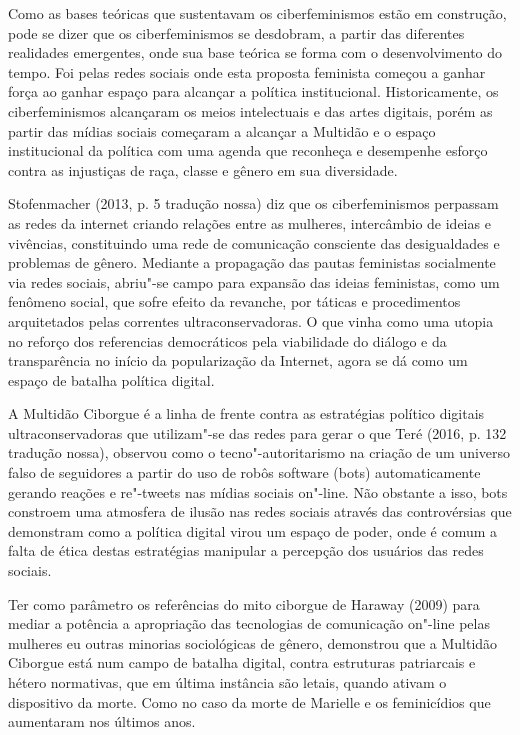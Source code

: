 Como as bases teóricas que sustentavam os ciberfeminismos estão em
construção, pode se dizer que os ciberfeminismos se desdobram, a partir
das diferentes realidades emergentes, onde sua base teórica se forma com
o desenvolvimento do tempo. Foi pelas redes sociais onde esta proposta
feminista começou a ganhar força ao ganhar espaço para alcançar a
política institucional. Historicamente, os ciberfeminismos alcançaram os
meios intelectuais e das artes digitais, porém as partir das mídias
sociais começaram a alcançar a Multidão e o espaço institucional da
política com uma agenda que reconheça e desempenhe esforço contra as
injustiças de raça, classe e gênero em sua diversidade.

Stofenmacher (2013, p. 5 tradução nossa) diz que os ciberfeminismos
perpassam as redes da internet criando relações entre as mulheres,
intercâmbio de ideias e vivências, constituindo uma rede de comunicação
consciente das desigualdades e problemas de gênero. Mediante a
propagação das pautas feministas socialmente via redes sociais, abriu"-se
campo para expansão das ideias feministas, como um fenômeno social, que
sofre efeito da revanche, por táticas e procedimentos arquitetados pelas
correntes ultraconservadoras. O que vinha como uma utopia no reforço dos
referencias democráticos pela viabilidade do diálogo e da transparência
no início da popularização da Internet, agora se dá como um espaço de
batalha política digital.

A Multidão Ciborgue é a linha de frente contra as estratégias político
digitais ultraconservadoras que utilizam"-se das redes para gerar o que
Teré (2016, p. 132 tradução nossa), observou como o tecno"-autoritarismo
na criação de um universo falso de seguidores a partir do uso de robôs
software (bots) automaticamente gerando reações e re"-tweets nas mídias
sociais on"-line. Não obstante a isso, bots constroem uma atmosfera de
ilusão nas redes sociais através das controvérsias que demonstram como a
política digital virou um espaço de poder, onde é comum a falta de ética
destas estratégias manipular a percepção dos usuários das redes sociais.

Ter como parâmetro os referências do mito ciborgue de Haraway (2009)
para mediar a potência a apropriação das tecnologias de comunicação
on"-line pelas mulheres eu outras minorias sociológicas de gênero,
demonstrou que a Multidão Ciborgue está num campo de batalha digital,
contra estruturas patriarcais e hétero normativas, que em última
instância são letais, quando ativam o dispositivo da morte. Como no caso
da morte de Marielle e os feminicídios que aumentaram nos últimos anos.

